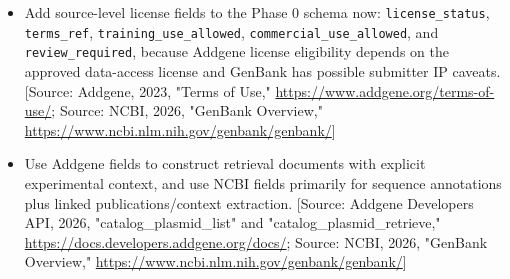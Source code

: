 \documentclass[11pt]{report}
\begin{document}
\begin{itemize}
\item Add source-level license fields to the Phase 0 schema now: \texttt{license\_status}, \texttt{terms\_ref}, \texttt{training\_use\_allowed}, \texttt{commercial\_use\_allowed}, and \texttt{review\_required}, because Addgene license eligibility depends on the approved data-access license and GenBank has possible submitter IP caveats. [Source: Addgene, 2023, "Terms of Use," \url{https://www.addgene.org/terms-of-use/}; Source: NCBI, 2026, "GenBank Overview," \url{https://www.ncbi.nlm.nih.gov/genbank/genbank/}]
\item Use Addgene fields to construct retrieval documents with explicit experimental context, and use NCBI fields primarily for sequence annotations plus linked publications/context extraction. [Source: Addgene Developers API, 2026, "catalog\_plasmid\_list" and "catalog\_plasmid\_retrieve," \url{https://docs.developers.addgene.org/docs/}; Source: NCBI, 2026, "GenBank Overview," \url{https://www.ncbi.nlm.nih.gov/genbank/genbank/}]
\end{itemize}
\end{document}
